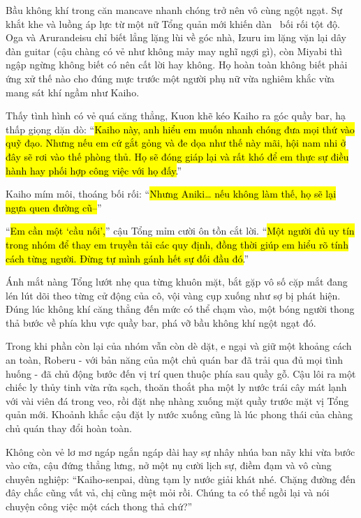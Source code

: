 \documentclass[../main.tex]{subfiles}
\begin{document}
Bầu không khí trong căn mancave nhanh chóng trở nên vô cùng ngột ngạt. Sự khắt khe và luồng áp lực từ một nữ Tổng quản mới khiến dàn \hls\ bối rối tột độ. Oga và Arurandeisu chỉ biết lẳng lặng lùi về góc nhà, Izuru im lặng vặn lại dây đàn guitar (cậu chàng có vẻ như không mảy may nghĩ ngợi gì), còn Miyabi thì ngập ngừng không biết có nên cất lời hay không. Họ hoàn toàn không biết phải ứng xử thế nào cho đúng mực trước một người phụ nữ vừa nghiêm khắc vừa mang sát khí ngầm như Kaiho.

Thấy tình hình có vẻ quá căng thẳng, Kuon khẽ kéo Kaiho ra góc quầy bar, hạ thấp giọng dặn dò: ``\hl{Kaiho này, anh hiểu em muốn nhanh chóng đưa mọi thứ vào quỹ đạo. Nhưng nếu em cứ gắt gỏng và đe dọa như thế này mãi, hội nam nhi ở đây sẽ rơi vào thế phòng thủ. Họ sẽ đóng giáp lại và rất khó để em thực sự điều hành hay phối hợp công việc với họ đấy.}''

Kaiho mím môi, thoáng bối rối: ``\hl{Nhưng Aniki\dots{} nếu không làm thế, họ sẽ lại ngựa quen đường cũ--}''

``\hl{Em cần một `cầu nối',}'' cậu Tổng mỉm cười ôn tồn cắt lời. ``\hl{Một người đủ uy tín trong nhóm để thay em truyền tải các quy định, đồng thời giúp em hiểu rõ tính cách từng người. Đừng tự mình gánh hết sự đối đầu đó.}''

Ánh mắt nàng Tổng lướt nhẹ qua từng khuôn mặt, bắt gặp vô số cặp mắt đang lén lút dõi theo từng cử động của cô, vội vàng cụp xuống như sợ bị phát hiện. Đúng lúc không khí căng thẳng đến mức có thể chạm vào, một bóng người thong thả bước về phía khu vực quầy bar, phá vỡ bầu không khí ngột ngạt đó.

Trong khi phần còn lại của nhóm vẫn còn dè dặt, e ngại và giữ một khoảng cách an toàn, Roberu - với bản năng của một chủ quán bar đã trải qua đủ mọi tình huống - đã chủ động bước đến vị trí quen thuộc phía sau quầy gỗ. Cậu lôi ra một chiếc ly thủy tinh vừa rửa sạch, thoăn thoắt pha một ly nước trái cây mát lạnh với vài viên đá trong veo, rồi đặt nhẹ nhàng xuống mặt quầy trước mặt vị Tổng quản mới. Khoảnh khắc cậu đặt ly nước xuống cũng là lúc phong thái của chàng chủ quán thay đổi hoàn toàn.

Không còn vẻ lơ mơ ngáp ngắn ngáp dài hay sự nhây nhúa ban nãy khi vừa bước vào cửa, cậu đứng thẳng lưng, nở một nụ cười lịch sự, điềm đạm và vô cùng chuyên nghiệp: ``Kaiho-senpai, dùng tạm ly nước giải khát nhé. Chặng đường đến đây chắc cũng vất vả, chị cũng mệt mỏi rồi. Chúng ta có thể ngồi lại và nói chuyện công việc một cách thong thả chứ?''
\end{document}
